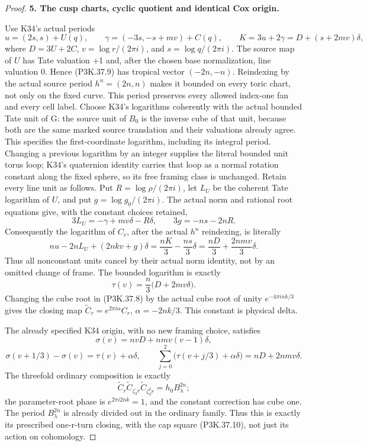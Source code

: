 \begin{proof}
\par\medskip\noindent\textbf{5. The cusp charts, cyclic quotient and identical Cox origin.}\enspace

Use K34's actual periods
\[
 u=(2s,s)+U(q),\qquad
 \gamma=(-3s,-s+mv)+C(q),\qquad
 K=3u+2\gamma=D+(s+2mv)\delta,
\]
where \(D=3U+2C\), \(v=\log r/(2\pi i)\), and
\(s=\log q/(2\pi i)\). The source map of \(U\) has Tate
valuation +1 and, after the chosen base normalization, line valuation 0.
Hence (P3K.37.9) has tropical vector \((-2n,-n)\). Reindexing by the
actual source period \(h^n=(2n,n)\) makes it bounded on every toric
chart, not only on the fixed curve. This period preserves every allowed
index-one fan and every cell label. Choose K34's logarithms coherently with
the actual bounded Tate unit of G: the source unit of \(B_0\) is the
inverse cube of that unit, because both are the same marked source translation
and their valuations already agree. This specifies the first-coordinate
logarithm, including its integral period. Changing a previous logarithm by an
integer supplies the literal bounded unit torus loop; K34's quaternion
identity carries that loop as a normal rotation constant along the fixed
sphere, so its free framing class is unchanged. Retain every line unit as
follows. Put \(R=\log\rho/(2\pi i)\), let \(L_U\) be the coherent
Tate logarithm of \(U\), and put \(g=\log g_0/(2\pi i)\). The
actual norm and rational root equations give, with the constant choices
retained,
\[
 3L_U=-\gamma+mv\delta-R\delta,\qquad
 3g=-ns-2nR.
\]
Consequently the logarithm of \(C_r\), after the actual \(h^n\)
reindexing, is literally
\[
 nu-2nL_U+(2nkv+g)\delta
   =\frac{nK}{3}-\frac{ns}{3}\delta
   =\frac{nD}{3}+\frac{2nmv}{3}\delta.
\]
Thus all nonconstant units cancel by their actual norm identity, not by an
omitted change of frame. The bounded logarithm is exactly
\[
 \tau(v)=\frac n3\bigl(D+2mv\delta\bigr).                      \tag{P3K.37.12}
\]
Changing the cube root in (P3K.37.8) by the actual cube root of unity
\(e^{-4\pi i nk/3}\) gives the closing map
\(\widetilde C_r=e^{2\pi i\alpha}C_r\),
\(\alpha=-2nk/3\). This constant is physical delta.

The already specified K34 origin, with no new framing choice, satisfies
\[
 \sigma(v)=nvD+nmv(v-1)\delta,
\]
\[
 \sigma(v+1/3)-\sigma(v)=\tau(v)+\alpha\delta,
\qquad
 \sum_{j=0}^{2}\bigl(\tau(v+j/3)+\alpha\delta\bigr)
       =nD+2nmv\delta.                                         \tag{P3K.37.13}
\]
The threefold ordinary composition is exactly
\[
 \widetilde C_r\widetilde C_{\zeta_3r}
       \widetilde C_{\zeta_3^2r}
     =h_0 B_\lambda^{2n};                                      \tag{P3K.37.14}
\]
the parameter-root phase is \(e^{2\pi i2nk}=1\), and the constant
correction has cube one. The period \(B_\lambda^{2n}\) is already
divided out in the ordinary family. Thus this is exactly its prescribed
one-r-turn closing, with the cap square (P3K.37.10), not just its action on
cohomology.


\end{proof}
